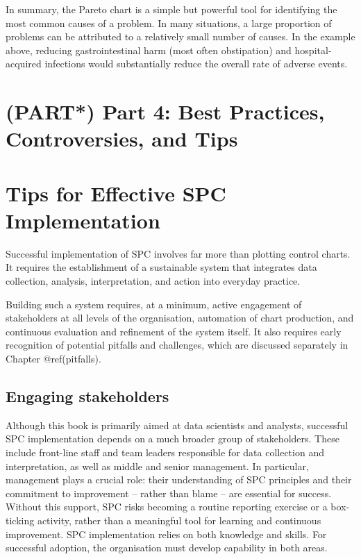 \documentclass[
]{book}
\begin{document}
In summary, the Pareto chart is a simple but powerful tool for
identifying the most common causes of a problem. In many situations, a
large proportion of problems can be attributed to a relatively small
number of causes. In the example above, reducing gastrointestinal harm
(most often obstipation) and hospital-acquired infections would
substantially reduce the overall rate of adverse events.

\chapter*{(PART*) Part 4: Best Practices, Controversies, and
Tips}\label{part-part-4-best-practices-controversies-and-tips}

\chapter{Tips for Effective SPC Implementation}\label{tips}

Successful implementation of SPC involves far more than plotting control
charts. It requires the establishment of a sustainable system that
integrates data collection, analysis, interpretation, and action into
everyday practice.

Building such a system requires, at a minimum, active engagement of
stakeholders at all levels of the organisation, automation of chart
production, and continuous evaluation and refinement of the system
itself. It also requires early recognition of potential pitfalls and
challenges, which are discussed separately in Chapter @ref(pitfalls).

\section{Engaging stakeholders}\label{engaging-stakeholders}

Although this book is primarily aimed at data scientists and analysts,
successful SPC implementation depends on a much broader group of
stakeholders. These include front-line staff and team leaders
responsible for data collection and interpretation, as well as middle
and senior management. In particular, management plays a crucial role:
their understanding of SPC principles and their commitment to
improvement -- rather than blame -- are essential for success. Without
this support, SPC risks becoming a routine reporting exercise or a
box-ticking activity, rather than a meaningful tool for learning and
continuous improvement. SPC implementation relies on both knowledge and
skills. For successful adoption, the organisation must develop
capability in both areas.
\end{document}

